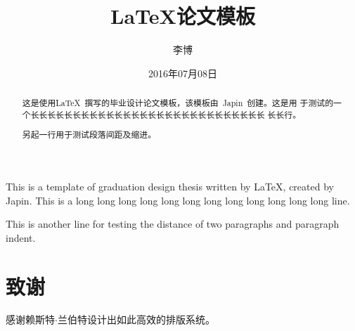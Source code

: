 \documentclass{swustthesis}
\title{\LaTeX{}论文模板}
\author{李博}
\date{2016年07月08日}
\begin{document}
\maketitle

\frontmatter

\begin{abstract}
  这是使用\LaTeX\ 撰写的毕业设计论文模板，该模板由~Japin~创建。这是用
  于测试的一个长长长长长长长长长长长长长长长长长长长长长长长长长长长长
  长长行。

  另起一行用于测试段落间距及缩进。
\end{abstract}


\begin{englishabstract}
  This is a template of graduation design thesis written by \LaTeX,
  created by Japin. This is a long long long long long long long long
  long long long long line.

  This is another line for testing the distance of two paragraphs and paragraph indent.
\end{englishabstract}


\tableofcontents

\mainmatter




\backmatter

\chapter{致谢}

感谢赖斯特$\cdot$兰伯特设计出如此高效的排版系统。
\end{document}
